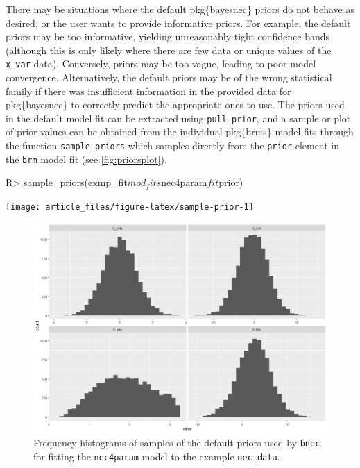 \documentclass[
]{jss}
\begin{document}
There may be situations where the default pkg\{bayesnec\} priors do not
behave as desired, or the user wants to provide informative priors. For
example, the default priors may be too informative, yielding
unreasonably tight confidence bands (although this is only likely where
there are few data or unique values of the \texttt{x\_var} data).
Conversely, priors may be too vague, leading to poor model convergence.
Alternatively, the default priors may be of the wrong statistical family
if there was insufficient information in the provided data for
pkg\{bayesnec\} to correctly predict the appropriate ones to use. The
priors used in the default model fit can be extracted using
\texttt{pull\_prior}, and a sample or plot of prior values can be
obtained from the individual pkg\{brms\} model fits through the function
\texttt{sample\_priors} which samples directly from the \texttt{prior}
element in the \texttt{brm} model fit (see \autoref{fig:priorsplot}).

\begin{CodeChunk}
\begin{CodeInput}
R> sample_priors(exmp_fit$mod_fits$nec4param$fit$prior)
\end{CodeInput}


\begin{center}\texttt{[image: article\_files/figure-latex/sample-prior-1]} \end{center}

\end{CodeChunk}

\begin{figure}
\centering
\includegraphics{sample_prior.png}
\caption{Frequency histograms of samples of the default priors used by
\texttt{bnec} for fitting the \texttt{nec4param} model to the example
\texttt{nec\_data}.\label{fig:priorsplot}}
\end{figure}
\end{document}
